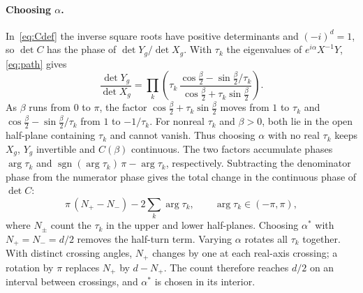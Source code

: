 \documentclass[11pt]{article}
\begin{document}
\paragraph{Choosing $\alpha$.} In~\eqref{eq:Cdef} the inverse square roots have positive
determinants and $(-i)^d=1$, so $\det C$ has the phase of $\det Y_g/\det X_g$. With $\tau_k$ the
eigenvalues of $e^{i\alpha}X^{-1}Y$, \eqref{eq:path} gives
\begin{equation}\label{eq:dets}
\frac{\det Y_g}{\det X_g}=\prod_k\left(\tau_k\,\frac{\cos\frac\beta2-\sin\frac\beta2/\tau_k}{\cos\frac\beta2+\tau_k\sin\frac\beta2}\right).
\end{equation}
As $\beta$ runs from $0$ to $\pi$, the factor $\cos\frac\beta2+\tau_k\sin\frac\beta2$ moves from $1$ to $\tau_k$ and $\cos\frac\beta2-\sin\frac\beta2/\tau_k$
from $1$ to $-1/\tau_k$. For nonreal $\tau_k$ and $\beta>0$, both lie in the open half-plane
containing $\tau_k$ and cannot vanish. Thus choosing $\alpha$ with no real $\tau_k$ keeps
$X_g$, $Y_g$ invertible and $C(\beta)$ continuous. The two factors accumulate phases $\arg\tau_k$ and
$\operatorname{sgn}(\arg\tau_k)\,\pi-\arg\tau_k$, respectively. Subtracting the denominator phase from the
numerator phase gives the total change in the continuous phase of $\det C$:
\begin{equation}\label{eq:dphase}
\pi\,(N_+-N_-)-2\sum_k\arg\tau_k ,\qquad \arg\tau_k\in(-\pi,\pi),
\end{equation}
where $N_\pm$ count the $\tau_k$ in the upper and lower half-planes. Choosing $\alpha^\ast$ with
$N_+=N_-=d/2$ removes the half-turn term. Varying $\alpha$ rotates all $\tau_k$
together. With distinct crossing angles, $N_+$ changes by one at each real-axis crossing; a
rotation by $\pi$ replaces $N_+$ by $d-N_+$. The count therefore reaches $d/2$ on an interval
between crossings, and $\alpha^\ast$ is chosen in its interior.
\end{document}
